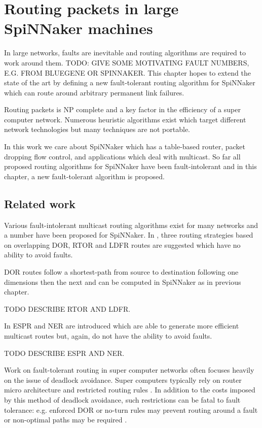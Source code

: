 \chapter{Routing packets in large SpiNNaker machines}
	
	In large networks, faults are inevitable and routing algorithms are required
	to work around them. TODO: GIVE SOME MOTIVATING FAULT NUMBERS, E.G.  FROM
	BLUEGENE OR SPINNAKER. This chapter hopes to extend the state of the art by
	defining a new fault-tolerant routing algorithm for SpiNNaker which can route
	around arbitrary permanent link failures.
	
	Routing packets is NP complete and a key factor in the efficiency of a
	super computer network. Numerous heuristic algorithms exist which target
	different network technologies but many techniques are not portable.
	
	In this work we care about SpiNNaker which has a table-based router, packet
	dropping flow control, and applications which deal with multicast. So far
	all proposed routing algorithms for SpiNNaker have been fault-intolerant
	and in this chapter, a new fault-tolerant algorithm is proposed.
	
	\section{Related work}
		
		Various fault-intolerant multicast routing algorithms exist for many
		networks and a number have been proposed for SpiNNaker. In \cite{davies12},
		three routing strategies based on overlapping DOR, RTOR and LDFR routes are
		suggested which have no ability to avoid faults.
		
		DOR routes follow a shortest-path from source to destination following one
		dimensions then the next and can be computed in SpiNNaker as in previous
		chapter.
		
		TODO DESCRIBE RTOR AND LDFR.
		
		In \cite{navaridas14} ESPR and NER are introduced which are able to
		generate more efficient multicast routes but, again, do not have the
		ability to avoid faults.
		
		TODO DESCRIBE ESPR AND NER.
		
		Work on fault-tolerant routing in super computer networks often focuses
		heavily on the issue of deadlock avoidance. Super computers typically rely
		on router micro architecture and restricted routing rules \cite{dally93}.
		In addition to the costs imposed by this method of deadlock avoidance, such
		restrictions can be fatal to fault tolerance: e.g. enforced DOR or no-turn
		rules may prevent routing around a fault or non-optimal paths may be
		required \cite{dally04}.
		
